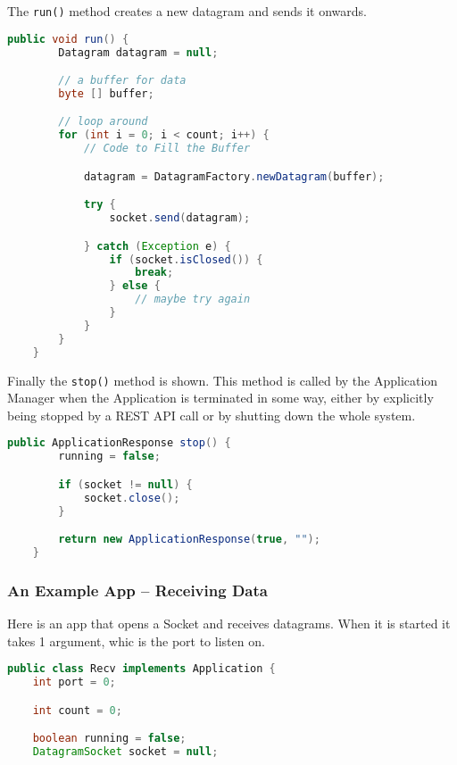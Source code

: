 \noindent The \texttt{run()} method creates a new datagram and sends
it onwards.

\begin{lstlisting}[language=java,frame=single]
    public void run() {
        Datagram datagram = null;

        // a buffer for data
        byte [] buffer;

        // loop around        
        for (int i = 0; i < count; i++) {
            // Code to Fill the Buffer

            datagram = DatagramFactory.newDatagram(buffer);

            try {
                socket.send(datagram);

            } catch (Exception e) {
                if (socket.isClosed()) {
                    break;
                } else {
                    // maybe try again
                }
            }
        }
    }
\end{lstlisting}

\noindent Finally the \texttt{stop()} method is shown.
This method is called by the Application Manager when the Application
is terminated in some way, either by explicitly being stopped by a
REST API call or by shutting down the whole system.


\begin{lstlisting}[language=java,frame=single]
    public ApplicationResponse stop() {
        running = false;

        if (socket != null) {
            socket.close();
        }

        return new ApplicationResponse(true, "");
    }
\end{lstlisting}

\subsubsection{An Example App -- Receiving Data}

Here is an app that opens a Socket and receives datagrams.
When it is started it takes 1 argument, whic is the port to listen on.

\begin{lstlisting}[language=java,frame=single]
public class Recv implements Application {
    int port = 0;

    int count = 0;

    boolean running = false;
    DatagramSocket socket = null;

\end{lstlisting}

